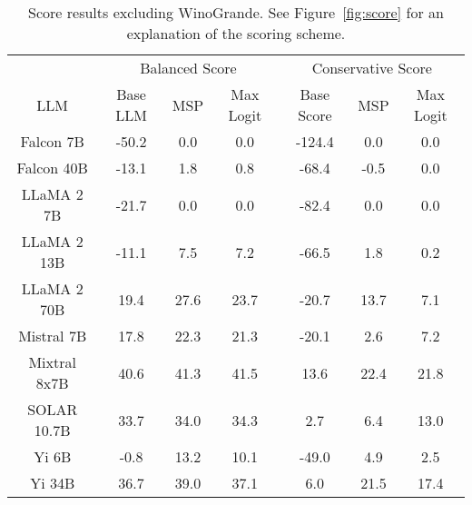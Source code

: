 \renewcommand\arraystretch{1.2}
\begin{table*}
\centering
\begin{tabular}{c|c|c|c|c|c|c}
& \multicolumn{3}{c|}{Balanced Score} & \multicolumn{3}{c}{Conservative Score} \\ 
LLM & Base LLM & MSP & Max Logit & Base Score & MSP & Max Logit\\ \hline
Falcon 7B & -50.2 & 0.0 & 0.0 & -124.4 & 0.0 & 0.0\\
Falcon 40B & -13.1 & 1.8 & 0.8 & -68.4 & -0.5 & 0.0\\
LLaMA 2 7B & -21.7 & 0.0 & 0.0 & -82.4 & 0.0 & 0.0\\
LLaMA 2 13B & -11.1 & 7.5 & 7.2 & -66.5 & 1.8 & 0.2\\
LLaMA 2 70B & 19.4 & 27.6 & 23.7 & -20.7 & 13.7 & 7.1\\
Mistral 7B & 17.8 & 22.3 & 21.3 & -20.1 & 2.6 & 7.2\\
Mixtral 8x7B & 40.6 & 41.3 & 41.5 & 13.6 & 22.4 & 21.8\\
SOLAR 10.7B & 33.7 & 34.0 & 34.3 & 2.7 & 6.4 & 13.0\\
Yi 6B & -0.8 & 13.2 & 10.1 & -49.0 & 4.9 & 2.5\\
Yi 34B & 36.7 & 39.0 & 37.1 & 6.0 & 21.5 & 17.4\\
\hline
\end{tabular}
\caption{Score results excluding WinoGrande. See Figure~\ref{fig:score} for an explanation of the scoring scheme.}
\label{tab:no_winogrande_score}
\end{table*}
